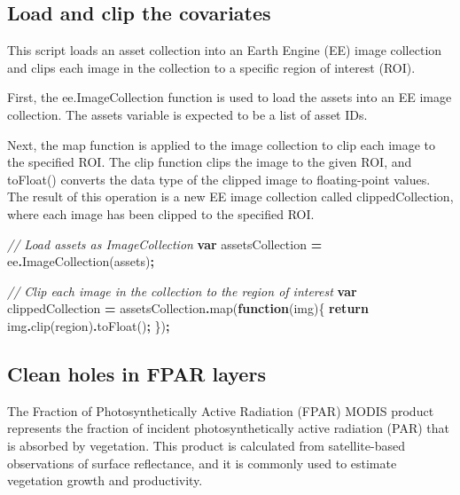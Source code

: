 \documentclass[
  10pt,
  b5paper,
  oneside]{book}
\newenvironment{Shaded}{\begin{snugshade}}{\end{snugshade}}
\newcommand{\CommentTok}[1]{\textcolor[rgb]{0.56,0.35,0.01}{\textit{#1}}}
\newcommand{\ControlFlowTok}[1]{\textcolor[rgb]{0.13,0.29,0.53}{\textbf{#1}}}
\newcommand{\FunctionTok}[1]{\textcolor[rgb]{0.00,0.00,0.00}{#1}}
\newcommand{\KeywordTok}[1]{\textcolor[rgb]{0.13,0.29,0.53}{\textbf{#1}}}
\newcommand{\NormalTok}[1]{#1}
\newcommand{\OperatorTok}[1]{\textcolor[rgb]{0.81,0.36,0.00}{\textbf{#1}}}
\begin{document}
\hypertarget{load-and-clip-the-covariates}{%
\subsection{Load and clip the covariates}\label{load-and-clip-the-covariates}}

This script loads an asset collection into an Earth Engine (EE) image collection and clips each image in the collection to a specific region of interest (ROI).

First, the ee.ImageCollection function is used to load the assets into an EE image collection. The assets variable is expected to be a list of asset IDs.

Next, the map function is applied to the image collection to clip each image to the specified ROI. The clip function clips the image to the given ROI, and toFloat() converts the data type of the clipped image to floating-point values. The result of this operation is a new EE image collection called clippedCollection, where each image has been clipped to the specified ROI.

\begin{Shaded}
\begin{Highlighting}[]
\CommentTok{// Load assets as ImageCollection}
\KeywordTok{var}\NormalTok{ assetsCollection }\OperatorTok{=}\NormalTok{ ee}\OperatorTok{.}\FunctionTok{ImageCollection}\NormalTok{(assets)}\OperatorTok{;}

\CommentTok{// Clip each image in the collection to the region of interest}
\KeywordTok{var}\NormalTok{ clippedCollection }\OperatorTok{=}\NormalTok{ assetsCollection}\OperatorTok{.}\FunctionTok{map}\NormalTok{(}\KeywordTok{function}\NormalTok{(img)\{}
  \ControlFlowTok{return}\NormalTok{ img}\OperatorTok{.}\FunctionTok{clip}\NormalTok{(region)}\OperatorTok{.}\FunctionTok{toFloat}\NormalTok{()}\OperatorTok{;}
\NormalTok{\})}\OperatorTok{;}
\end{Highlighting}
\end{Shaded}

\hypertarget{clean-holes-in-fpar-layers}{%
\subsection{Clean holes in FPAR layers}\label{clean-holes-in-fpar-layers}}

The Fraction of Photosynthetically Active Radiation (FPAR) MODIS product represents the fraction of incident photosynthetically active radiation (PAR) that is absorbed by vegetation. This product is calculated from satellite-based observations of surface reflectance, and it is commonly used to estimate vegetation growth and productivity.
\end{document}
